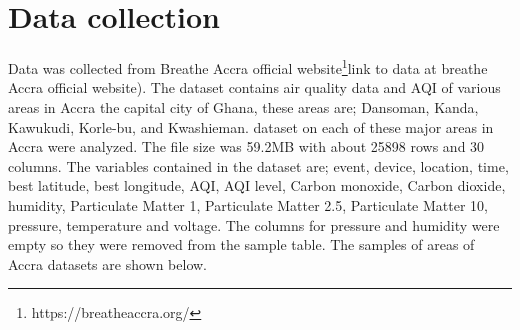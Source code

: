 \documentclass{book}
\numberwithin{equation}{section}
\numberwithin{figure}{section}
\begin{document}
\section{Data collection}
\label{data}
\vspace{-5mm} %
Data was collected from Breathe Accra official website\footnote{https://breatheaccra.org/}{link to data at breathe Accra official website}).
The dataset contains air quality data and AQI of various areas in Accra the capital city of Ghana, these areas are; Dansoman, Kanda, Kawukudi, Korle-bu, and Kwashieman. dataset on each of these major areas in Accra were analyzed. The file size was 59.2MB with about 25898 rows and 30 columns. The variables contained in the dataset are; event, device, location, time, best latitude, best longitude, AQI, AQI level, Carbon monoxide, Carbon dioxide, humidity, Particulate Matter 1, Particulate Matter 2.5, Particulate Matter 10, pressure, temperature and voltage. The columns for pressure and humidity were empty so they were removed from the sample table. The samples of areas of Accra datasets are shown below.
 \begin{table}[H]
    \centering
        \caption{ Sample of the Dansoman dataset}
        \label{tab:Dansoman}
    \large %
\end{table}
\end{document}
